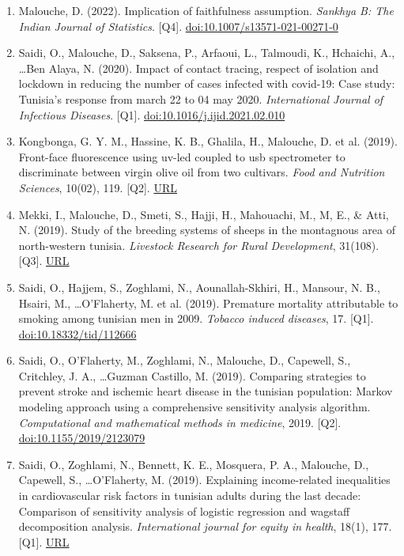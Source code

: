 \documentclass[11pt,a4paper,sans]{moderncv}
\begin{document}
\begin{enumerate}
\item Malouche, D. (2022). Implication of faithfulness assumption. \textit{Sankhya B: The Indian Journal of Statistics}. [Q4]. \href{https://doi.org/10.1007/s13571-021-00271-0}{doi:10.1007/s13571-021-00271-0}
\item Saidi, O., Malouche, D., Saksena, P., Arfaoui, L., Talmoudi, K., Hchaichi, A., \ldots Ben Alaya, N. (2020). Impact of contact tracing, respect of isolation and lockdown in reducing the number of cases infected with covid-19: Case study: Tunisia's response from march 22 to 04 may 2020. \textit{International Journal of Infectious Diseases}. [Q1]. \href{https://doi.org/10.1016/j.ijid.2021.02.010}{doi:10.1016/j.ijid.2021.02.010}
\item Kongbonga, G. Y. M., Hassine, K. B., Ghalila, H., Malouche, D. et al. (2019). Front-face fluorescence using uv-led coupled to usb spectrometer to discriminate between virgin olive oil from two cultivars. \textit{Food and Nutrition Sciences}, 10(02), 119. [Q2]. \href{http://www.scirp.org/journal/PaperInformation.aspx?PaperID=90405&#abstract}{URL}
\item Mekki, I., Malouche, D., Smeti, S., Hajji, H., Mahouachi, M., M, E., \& Atti, N. (2019). Study of the breeding systems of sheeps in the montagnous area of north-western tunisia. \textit{Livestock Research for Rural Development}, 31(108). [Q3]. \href{http://www.lrrd.org/lrrd31/7/ilyes31108.html}{URL}
\item Saidi, O., Hajjem, S., Zoghlami, N., Aounallah-Skhiri, H., Mansour, N. B., Hsairi, M., \ldots O'Flaherty, M. et al. (2019). Premature mortality attributable to smoking among tunisian men in 2009. \textit{Tobacco induced diseases}, 17. [Q1]. \href{https://dx.doi.org/10.18332%2Ftid%2F112666}{doi:10.18332/tid/112666}
\item Saidi, O., O'Flaherty, M., Zoghlami, N., Malouche, D., Capewell, S., Critchley, J. A., \ldots Guzman Castillo, M. (2019). Comparing strategies to prevent stroke and ischemic heart disease in the tunisian population: Markov modeling approach using a comprehensive sensitivity analysis algorithm. \textit{Computational and mathematical methods in medicine}, 2019. [Q2]. \href{https://doi.org/10.1155/2019/2123079}{doi:10.1155/2019/2123079}
\item Saidi, O., Zoghlami, N., Bennett, K. E., Mosquera, P. A., Malouche, D., Capewell, S., \ldots O'Flaherty, M. (2019). Explaining income-related inequalities in cardiovascular risk factors in tunisian adults during the last decade: Comparison of sensitivity analysis of logistic regression and wagstaff decomposition analysis. \textit{International journal for equity in health}, 18(1), 177. [Q1]. \href{https://equityhealthj.biomedcentral.com/articles/10.1186/s12939-019-1047-6}{URL}

\end{enumerate}
\end{document}
